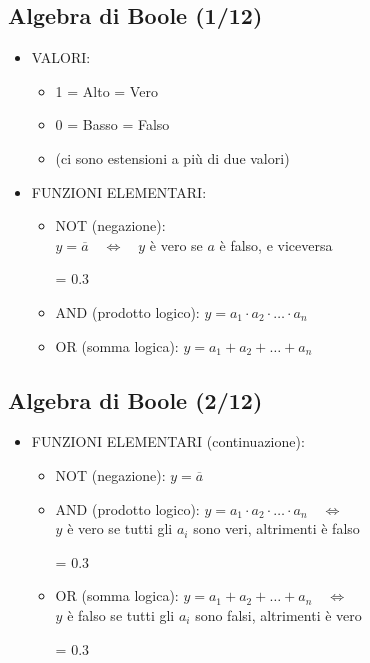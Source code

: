 \documentclass[10pt,a4paper,twoside,twocolumn]{article}
\begin{document}
\subsection{Algebra di Boole (1/12)}
\begin{itemize}
\item
VALORI:
\begin{itemize}
\item
1 = Alto = Vero
\item
0 = Basso = Falso
\item
(ci sono estensioni a pi\`u di due valori)
\end{itemize}
\item
FUNZIONI ELEMENTARI:
\begin{itemize}
\item
NOT (negazione): \\
$y = \overline{a}$~~$\Longleftrightarrow$~~$y$ \`e vero se $a$ \`e falso, e viceversa
\begin{center}
\epsfxsize = 0.3 \columnwidth
{}
\end{center}
\item
AND (prodotto logico):
$y = a_1 \cdot a_2 \cdot \ldots \cdot a_n$
\item
OR (somma logica):
$y = a_1 + a_2 + \ldots + a_n$
\end{itemize}
\end{itemize}



\subsection{Algebra di Boole (2/12)}
\begin{itemize}
\item
FUNZIONI ELEMENTARI (continuazione):
\begin{itemize}
\item
NOT (negazione): $y = \overline{a}$
\item
AND (prodotto logico): 
$y = a_1 \cdot a_2 \cdot \ldots \cdot a_n$~~$\Longleftrightarrow$ \\ 
$y$ \`e vero se tutti gli $a_i$ sono veri, altrimenti \`e falso
\begin{center}
\epsfxsize = 0.3 \columnwidth
{}
\end{center}
\item
OR (somma logica): 
$y = a_1 + a_2 + \ldots + a_n$~~$\Longleftrightarrow$ \\
$y$ \`e falso se tutti gli $a_i$ sono falsi, altrimenti \`e vero
\begin{center}
\epsfxsize = 0.3 \columnwidth
{}
\end{center}
\end{itemize}
\end{itemize}
\end{document}
